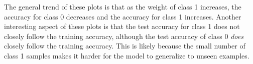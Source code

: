\documentclass{article}
\begin{document}
\begin{enumerate}
\begin{enumerate}
\begin{figure}[H]
        \end{figure}
        \begin{figure}[H]
                \centering
        \end{figure}
	The general trend of these plots is that as the weight of class 1 increases, the accuracy for class 0 decreases and the accuracy for class 1 increases. Another interesting aspect of these plots is that the test accuracy for class 1 does not closely follow the training accuracy, although the test accuracy of class 0 \textit{does} closely follow the training accuracy. This is likely because the small number of class 1 samples makes it harder for the model to generalize to unseen examples.
\end{enumerate}
\end{enumerate}
\end{document}
